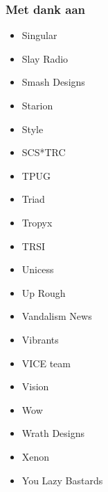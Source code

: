\begin{frame}
\frametitle{Met dank aan}

\begin{multicols}{3}
\begin{itemize}
\item Singular
\item Slay Radio
\item Smash Designs
\item Starion
\item Style
\item SCS*TRC
\item TPUG
\item Triad
\item Tropyx
\item TRSI
\item Unicess
\item Up Rough
\item Vandalism News
\item Vibrants
\item VICE team
\item Vision
\item Wow
\item Wrath Designs
\item Xenon
\item You Lazy Bastards
\end{itemize}
\end{multicols}

\end{frame}
